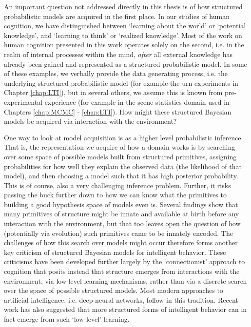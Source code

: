 An important question not addressed directly in this thesis is of how structured probabilistic models are acquired in the first place. In our studies of human cognition, we have distinguished between `learning about the world' or `potential knowledge', and `learning to think' or `realized knowledge'. Most of the work on human cognition presented in this work operates solely on the second, i.e. in the realm of internal processes within the mind, \textit{after} all external knowledge has already been gained and represented as a structured probabilistic model. In some of these examples, we verbally provide the data generating process, i.e. the underlying structured probabilistic model (for example the urn experiments in Chapter \ref{chap:LTI}), but in several others, we assume this is known from pre-experimental experience (for example in the scene statistics domain used in Chapters \ref{chap:MCMC} - \ref{chap:LTI}). How might these structured Bayesian models be acquired via interaction with the environment?

One way to look at model acquisition is as a higher level probabilistic inference. That is, the representation we acquire of how a domain works is by searching over some space of possible models built from structured primitives, assigning probabilities for how well they explain the observed data (the likelihood of that model), and then choosing a model such that it has high posterior probability. This is of course, also a very challenging inference problem\citep{schulz2012finding, bramley2018grounding}. Further, it risks passing the buck further down to how we can know what the primitives to building a good hypothesis space of models even is. Several findings show that many primitives of structure might be innate and available at birth before any interaction with the environment\citep{spelke1998nativism, chomsky1967recent}, but that too leaves open the question of how (potentially via evolution) such primitives came to be innately encoded. The challenges of how this search over models might occur therefore forms another key criticism of structured Bayesian models for intelligent behavior. These criticisms have been developed further largely by the `connectionist' approach to cognition\citep{rogers2004semantic, mcclelland2010letting} that posits instead that structure emerges from interactions with the environment, via low-level learning mechanisms, rather than via a discrete search over the space of possible structured models. Most modern approaches to artificial intelligence, i.e. deep neural networks, follow in this tradition. Recent work has also suggested that more structured forms of intelligent behavior can in fact emerge from such `low-level' learning\citep{dasgupta2019causal, wang2018, botvinick2019reinforcement}.

